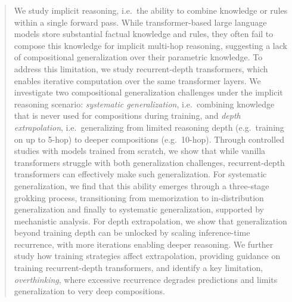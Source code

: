 \documentclass{article} %
\newcommand{\hs}[1]{\textcolor{red}{[Huan: #1]}}
\newcommand{\yy}[1]{\textcolor{blue}{[Yuekun: #1]}}
\begin{document}
\begin{abstract}
We study implicit reasoning, i.e.\ the ability to combine knowledge or rules within a single forward pass.
While transformer-based large language models store substantial factual knowledge and rules, they often fail to compose this knowledge for implicit multi-hop reasoning, suggesting a lack of compositional generalization over their parametric knowledge.
To address this limitation, we study recurrent-depth transformers, which enables iterative computation over the same transformer layers.
We investigate two compositional generalization challenges under the implicit reasoning scenario: \textit{systematic generalization}, i.e.\ combining knowledge that is never used for compositions during training, and \textit{depth extrapolation}, i.e.\ generalizing from limited reasoning depth (e.g.\ training on up to 5-hop) to deeper compositions (e.g.\ 10-hop).
Through controlled studies with models trained from scratch, we show that while vanilla transformers struggle with both generalization challenges, recurrent-depth transformers can effectively make such generalization.
For systematic generalization, we find that this ability emerges through a three-stage grokking process, transitioning from memorization to in-distribution generalization and finally to systematic generalization, supported by mechanistic analysis.
For depth extrapolation, we show that generalization beyond training depth can be unlocked by scaling inference-time recurrence, with more iterations enabling deeper reasoning.
We further study how training strategies affect extrapolation, providing guidance on training recurrent-depth transformers, and identify a key limitation, \textit{overthinking}, where excessive recurrence degrades predictions and limits generalization to very deep compositions.
\end{abstract}



% 

\end{document}
